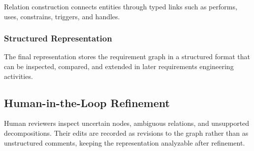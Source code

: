 Relation construction connects entities through typed links such as performs, uses, constrains, triggers, and handles.

\subsubsection{Structured Representation}
\label{sec:method-structured-representation}

The final representation stores the requirement graph in a structured format that can be inspected, compared, and extended in later requirements engineering activities.

\subsection{Human-in-the-Loop Refinement}
\label{sec:method-hitl}

Human reviewers inspect uncertain nodes, ambiguous relations, and unsupported decompositions.
Their edits are recorded as revisions to the graph rather than as unstructured comments, keeping the representation analyzable after refinement.
